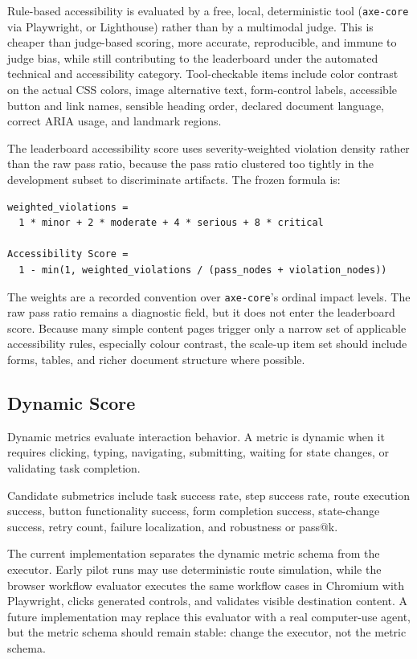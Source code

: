 Rule-based accessibility is evaluated by a free, local, deterministic tool
(\texttt{axe-core} via Playwright, or Lighthouse) rather than by a multimodal
judge. This is cheaper than judge-based scoring, more accurate, reproducible,
and immune to judge bias, while still contributing to the leaderboard under the
automated technical and accessibility category. Tool-checkable items include
color contrast on the actual CSS colors, image alternative text, form-control
labels, accessible button and link names, sensible heading order, declared
document language, correct \mbox{ARIA} usage, and landmark regions.

The leaderboard accessibility score uses severity-weighted violation density
rather than the raw pass ratio, because the pass ratio clustered too tightly in
the development subset to discriminate artifacts. The frozen formula is:

\begin{verbatim}
weighted_violations =
  1 * minor + 2 * moderate + 4 * serious + 8 * critical

Accessibility Score =
  1 - min(1, weighted_violations / (pass_nodes + violation_nodes))
\end{verbatim}

The weights are a recorded convention over \texttt{axe-core}'s ordinal impact
levels. The raw pass ratio remains a diagnostic field, but it does not enter
the leaderboard score. Because many simple content pages trigger only a narrow
set of applicable accessibility rules, especially colour contrast, the scale-up
item set should include forms, tables, and richer document structure where
possible.

\subsection{Dynamic Score}

Dynamic metrics evaluate interaction behavior. A metric is dynamic when it
requires clicking, typing, navigating, submitting, waiting for state changes, or
validating task completion.

Candidate submetrics include task success rate, step success rate, route
execution success, button functionality success, form completion success,
state-change success, retry count, failure localization, and robustness or
pass@k.

The current implementation separates the dynamic metric schema from the
executor. Early pilot runs may use deterministic route simulation, while the
browser workflow evaluator executes the same workflow cases in Chromium with
Playwright, clicks generated controls, and validates visible destination
content. A future implementation may replace this evaluator with a real
computer-use agent, but the metric schema should remain stable: change the
executor, not the metric schema.

